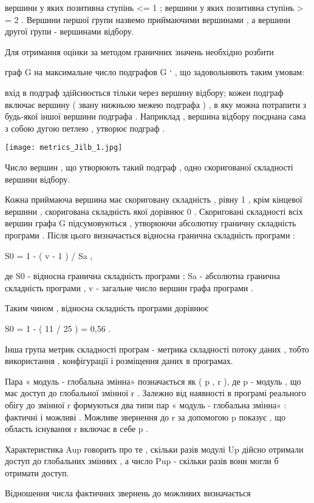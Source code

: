 вершини у яких позитивна ступінь \textless{}= 1 ;
вершини у яких позитивна ступінь \textgreater{} = 2 .
Вершини першої групи назвемо приймаючими вершинами , а вершини другої групи - вершинами відбору.

Для отримання оцінки за методом граничних значень необхідно розбити

граф G на максимальне число подграфов G ` , що задовольняють таким умовам:

вхід в подграф здійснюється тільки через вершину відбору;
кожен подграф включає вершину ( звану нижньою межею подграфа ) , в яку можна потрапити з будь-якої іншої вершини подграфа . Наприклад , вершина відбору поєднана сама з собою дугою петлею , утворює подграф .

\texttt{[image: metrics\_Jilb\_1.jpg]}

Число вершин , що утворюють такий подграф , одно скоригованої складності вершини відбору.

Кожна приймаюча вершина має скориговану складність , рівну 1 , крім кінцевої вершини , скоригована складність якої дорівнює 0 . Скориговані складності всіх вершин графа G підсумовуються , утворюючи абсолютну граничну складність програми . Після цього визначається відносна гранична складність програми :

S0 = 1 - ( v - 1 ) / Sa ,

де S0 - відносна гранична складність програми ; Sa - абсолютна гранична складність програми , v - загальне число вершин графа програми .

Таким чином , відносна складність програми дорівнює

S0 = 1 - ( 11 / 25 ) = 0,56 .

Інша група метрик складності програм - метрика складності потоку даних , тобто використання , конфігурації і розміщення даних в програмах.

Пара « модуль - глобальна змінна» позначається як ( p , r ), де p - модуль , що має доступ до глобальної змінної r . Залежно від наявності в програмі реального обігу до змінної r формуються два типи пар « модуль - глобальна змінна» : фактичні і можливі . Можливе звернення до r за допомогою p показує , що область існування r включає в себе p .

Характеристика Aup говорить про те , скільки разів модулі Up дійсно отримали доступ до глобальних змінних , а число Pup - скільки разів вони могли б отримати доступ.

Відношення числа фактичних звернень до можливих визначається

